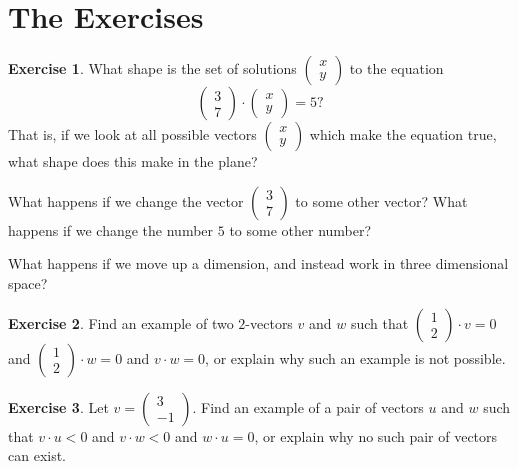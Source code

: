 \documentclass[11pt]{amsart}
\theoremstyle{definition}
\newtheorem{exercise}{Exercise}
\begin{document}
\section{The Exercises}

\begin{exercise}
What shape is the set of solutions $\left(\begin{smallmatrix} x \\ y\end{smallmatrix}\right)$ to the equation
\begin{equation*}
\begin{pmatrix} 3 \\ 7 \end{pmatrix} \cdot \begin{pmatrix} x \\ y \end{pmatrix} = 5?
\end{equation*}
That is, if we look at all possible vectors $\left( \begin{smallmatrix} x \\ y \end{smallmatrix} \right)$ which make the equation true, what shape does this make in the plane?

What happens if we change the vector $\left(\begin{smallmatrix} 3 \\ 7\end{smallmatrix}\right)$ to some other vector? What happens if we change the number $5$ to some other number?

What happens if we move up a dimension, and instead work in three dimensional space?
\end{exercise}

\begin{exercise}
Find an example of two $2$-vectors $v$ and $w$ such that $\left(\begin{smallmatrix} 1 \\ 2 \end{smallmatrix}\right) \cdot v =0$ and $\left(\begin{smallmatrix} 1 \\ 2 \end{smallmatrix}\right) \cdot w = 0$ and $v\cdot w = 0$, or explain why such an example is not possible.
\end{exercise}

\begin{exercise}
Let $v = \left( \begin{smallmatrix} 3 \\ -1 \end{smallmatrix} \right)$. Find an example of a pair of vectors $u$ and $w$ such that $v \cdot u < 0$ and $v \cdot w < 0$ and $w\cdot u =0$, or explain why no such pair of vectors can exist.
\end{exercise}
\end{document}
